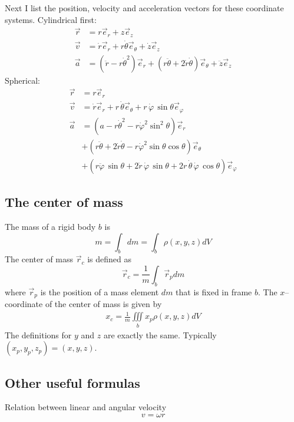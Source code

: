 Next I list the position, velocity and acceleration vectors for these coordinate systems. Cylindrical first:
\begin{align}
    \vec{r} &= r\vec{e}_r + z\vec{e}_z\\
    \vec{v} &= \dot{r}\vec{e}_r + r\dot{\theta}\vec{e}_{\theta} + \dot{z}\vec{e}_z\\
    \vec{a} &= \left ( \ddot{r} - r\dot{\theta}^2\right )\vec{e}_r + \left ( r \ddot{\theta} + 2 \dot{r} \dot{\theta} \right )\vec{e}_{\theta} + \ddot{z}\vec{e}_z
\end{align}
Spherical:
\begin{align}
    \vec{r} & = r \vec{e}_r\\
    \vec{v} & = \dot{r} \vec{e}_r + r\,\dot{\theta}\vec{e}_\theta + r\,\dot{\varphi}\,\sin\theta \vec{e}_\varphi \\
    \vec{a} & = \left( a - r \dot{\theta}^2 - r\dot{\varphi}^2\sin^2\theta \right)\vec{e}_r \\
     & + \left( r \ddot{\theta} + 2 \dot{r} \dot{\theta} - r\dot{\varphi}^2\sin\theta\cos\theta \right) \vec{e}_\theta \\
     & + \left( r\ddot{\varphi}\,\sin\theta + 2\dot{r}\,\dot{\varphi}\,\sin\theta + 2 r\,\dot{\theta}\,\dot{\varphi}\,\cos\theta \right) \vec{e}_\varphi
\end{align}

\subsection{The center of mass}
The mass of a rigid body $b$ is
\begin{equation}
    m = \int_{b}dm = \int_{b} \rho(x,y,z)dV
\end{equation}
The center of mass $\vec{r}_c$ is defined as
\begin{equation}
    \vec{r}_c = \frac{1}{m} \int_{b} \vec{r}_p dm
\end{equation}
where $\vec{r}_p$ is the position of a mass element $dm$ that is fixed in frame $b$. The $x$--coordinate of the center of mass is given by
\begin{align}
    x_c = \frac{1}{m} \iiint \limits_b x_p \rho(x,y,z)dV
\end{align}
The definitions for $y$ and $z$ are exactly the same. Typically $(x_p, y_p, z_p) = (x, y, z)$.

\subsection{Other useful formulas}
Relation between linear and angular velocity
\begin{equation}
    v = \omega r
\end{equation}

